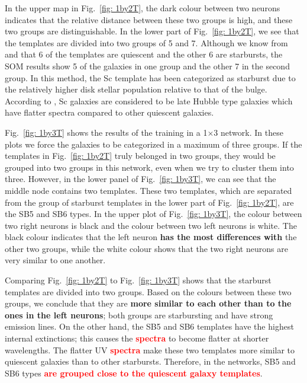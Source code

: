         
            In the upper map in Fig.~\ref{fig: 1by2T}, the dark colour between two neurons indicates that the relative distance between these two groups is high, and these two groups are distinguishable.
            In the lower part of Fig.~\ref{fig: 1by2T}, we see that the templates are divided into two groups of 5 and 7.
            Although we know from  and  that 6 of the templates are quiescent and the other 6 are starbursts, the SOM results show 5 of the galaxies in one group and the other 7 in the second group.
            In this method, the Sc template has been categorized as starburst due to the relatively higher disk stellar population relative to that of the bulge. 
            According to , Sc galaxies are considered to be late Hubble type galaxies which have  flatter spectra compared to other quiescent galaxies. 
            

            Fig.~\ref{fig: 1by3T} shows the results of the training in a 1$\times$3 network.
            In these plots we force the galaxies to be categorized in a maximum of three groups. 
            If the templates in Fig.~\ref{fig: 1by2T} truly belonged in two groups, they would be grouped into two groups in this network, even when we try to cluster them into three. 
            However, in the lower panel of Fig.~\ref{fig: 1by3T}, we can see that the middle node contains two templates.
            These two templates, which are separated from the group of starburst templates in the lower part of Fig.~\ref{fig: 1by2T},  are the SB5 and SB6 types.
            In the upper plot of Fig.~\ref{fig: 1by3T}, the colour between two right neurons is black and the colour between two left neurons is white. 
            The black colour indicates that the left neuron \textbf{has the most differences with} the other two groups,
            while the white colour shows that the two right neurons are very similar to one another. 
            
            Comparing Fig.~\ref{fig: 1by2T} to Fig.~\ref{fig: 1by3T} shows that the starburst templates are divided into two groups. 
            Based on the colours between these two groups, we conclude that they are \textbf{more similar to each other than to the ones in the left neurons}; both groups are starbursting and have strong emission lines.
            On the other hand, the SB5 and SB6 templates have the highest internal extinctions; this causes the \textbf{\textcolor{red}{spectra}} to become flatter at shorter wavelengths. 
            The flatter UV \textbf{\textcolor{red}{spectra}} make these two templates more similar to quiescent galaxies than to other starbursts.
            Therefore, in the networks, SB5 and SB6 types \textbf{\textcolor{red}{are grouped close to the quiescent galaxy templates}}.
                
